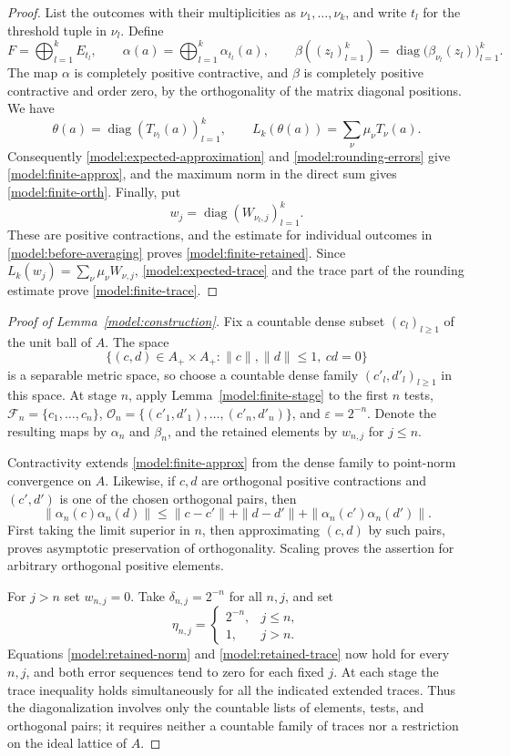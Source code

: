 \begin{proof}
List the outcomes with their multiplicities as
$\nu_1,\ldots,\nu_k$, and write $t_l$ for the threshold
tuple in $\nu_l$.  Define
\[
 F=\bigoplus_{l=1}^k E_{t_l},\qquad
 \alpha(a)=\bigoplus_{l=1}^k\alpha_{t_l}(a),\qquad
 \beta((z_l)_{l=1}^k)
    =\operatorname{diag}\bigl(\beta_{\nu_l}(z_l)\bigr)_{l=1}^k.
\]
The map $\alpha$ is completely positive contractive, and $\beta$
is completely positive contractive and order zero, by the
orthogonality of the matrix diagonal positions.  We have
\[
 \theta(a)=\operatorname{diag}(T_{\nu_l}(a))_{l=1}^k,
 \qquad
 L_k(\theta(a))=\sum_\nu\mu_\nu T_\nu(a).
\]
Consequently \eqref{model:expected-approximation} and
\eqref{model:rounding-errors} give \eqref{model:finite-approx},
and the maximum norm in the direct sum gives
\eqref{model:finite-orth}.  Finally, put
\[
 w_j=\operatorname{diag}(W_{\nu_l,j})_{l=1}^k.
\]
These are positive contractions, and the estimate for individual
outcomes in \eqref{model:before-averaging} proves
\eqref{model:finite-retained}.  Since
$L_k(w_j)=\sum_\nu\mu_\nu W_{\nu,j}$,
\eqref{model:expected-trace} and the trace part of the rounding
estimate prove \eqref{model:finite-trace}.
\end{proof}

\begin{proof}[Proof of Lemma~\ref{model:construction}]
Fix a countable dense subset $(c_l)_{l\geq1}$ of the unit ball of
$A$.  The space
\[
 \{(c,d)\in A_+\times A_+:
           \|c\|,\|d\|\leq1,\ cd=0\}
\]
is a separable metric space, so choose a countable dense family
$(c'_l,d'_l)_{l\geq1}$ in this space.  At stage $n$, apply
Lemma~\ref{model:finite-stage} to the first $n$ tests,
$\mathcal F_n=\{c_1,\ldots,c_n\}$,
$\mathcal O_n=\{(c'_1,d'_1),\ldots,(c'_n,d'_n)\}$, and
$\varepsilon=2^{-n}$.  Denote the resulting maps by $\alpha_n$
and $\beta_n$, and the retained elements by $w_{n,j}$ for
$j\leq n$.

Contractivity extends \eqref{model:finite-approx} from the dense
family to point-norm convergence on $A$.  Likewise, if $c,d$ are
orthogonal positive contractions and $(c',d')$ is one of the
chosen orthogonal pairs, then
\[
 \|\alpha_n(c)\alpha_n(d)\|
 \leq\|c-c'\|+\|d-d'\|
       +\|\alpha_n(c')\alpha_n(d')\|.
\]
First taking the limit superior in $n$, then approximating
$(c,d)$ by such pairs, proves asymptotic preservation of
orthogonality.  Scaling proves the assertion for arbitrary
orthogonal positive elements.

For $j>n$ set $w_{n,j}=0$.  Take $\delta_{n,j}=2^{-n}$ for all
$n,j$, and set
\[
 \eta_{n,j}=
 \begin{cases}
  2^{-n},&j\leq n,\\
  1,&j>n.
 \end{cases}
\]
Equations \eqref{model:retained-norm} and
\eqref{model:retained-trace} now hold for every $n,j$, and both
error sequences tend to zero for each fixed $j$.  At each stage
the trace inequality holds simultaneously for all the indicated
extended traces.  Thus the diagonalization involves only the
countable lists of elements, tests, and orthogonal pairs; it
requires neither a countable family of traces nor a restriction
on the ideal lattice of $A$.
\end{proof}

